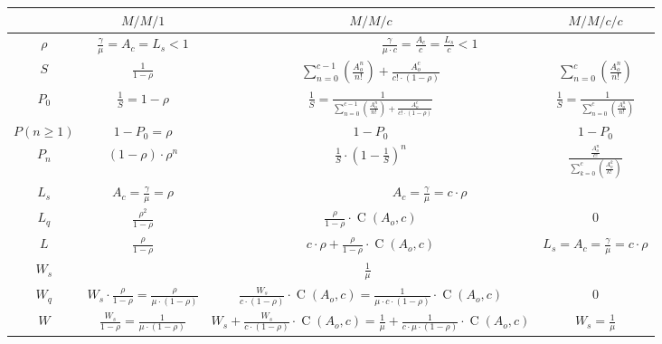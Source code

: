 \documentclass[
	12pt,
	twoside
]{book}
\begin{document}
\begin{landscape}

\begin{table}[H]
	\centering
	\begin{tabular}{|c|c|c|c|}
		\hline
		& $M/M/1$ & $M/M/c$ & $M/M/c/c$ \\
		\hline
		$\rho$ & $\frac {\gamma} {\mu} = A_c = L_s < 1$ & \multicolumn{2}{c|}{$\frac {\gamma} {\mu \cdot c} = \frac {A_c} {c} = \frac {L_s} {c} < 1$} \\
		\hline
		$S$ & $\frac {1} {1 - \rho}$ & $\sum_{n=0}^{c-1} \left( \frac {A_{o}^n} {n!} \right) + \frac {A_{o}^c} {c! \cdot (1-\rho)}$ & $\sum_{n=0}^{c} \left( \frac {A_{o}^n} {n!} \right)$ \\
		\hline
		$P_0$ & $\frac {1} {S} = 1 - \rho$ & $\frac {1} {S} = \frac {1} {\sum_{n=0}^{c-1} \left( \frac {A_{o}^n} {n!} \right) + \frac {A_{o}^c} {c! \cdot (1-\rho)}}$ & $\frac {1} {S} = \frac {1} {\sum_{n=0}^{c} \left( \frac {A_{o}^n} {n!} \right)}$ \\
		\hline
		$P(n \geq 1)$ & $1 - P_0 = \rho$ & $1 - P_0$ & $1 - P_0$ \\
		\hline
		$P_n$ & $(1 - \rho) \cdot \rho^n$ & $\frac {1} {S} \cdot \left( 1 - \frac {1} {S} \right)^n$ & $\frac {\frac{A_{o}^n}{c!}} {\sum_{k=0}^c \left( \frac {A_{o}^k} {k!} \right)}$ \\
		\hline
		$L_s$ & $A_c = \frac {\gamma} {\mu} = \rho$ & \multicolumn{2}{c|}{$A_c = \frac {\gamma} {\mu} = c \cdot \rho$} \\
		\hline
		$L_q$ & $\frac {\rho^2} {1-\rho}$ & $\frac {\rho} {1-\rho} \cdot \operatorname{C}(A_o, c)$ & $0$ \\
		\hline
		$L$ & $\frac {\rho} {1-\rho}$ & $c \cdot \rho + \frac {\rho} {1-\rho} \cdot \operatorname{C}(A_o, c)$ & $L_s = A_c = \frac {\gamma} {\mu} = c \cdot \rho$ \\
		\hline
		$W_s$ & \multicolumn{3}{c|}{$\frac {1} {\mu}$} \\
		\hline
		$W_q$ & $W_s \cdot \frac {\rho} {1-\rho} = \frac {\rho} {\mu \cdot (1-\rho)}$ & $\frac {W_s} {c \cdot (1-\rho)} \cdot \operatorname{C}(A_o, c) = \frac {1} {\mu \cdot c \cdot (1-\rho)} \cdot \operatorname{C}(A_o, c)$ & $0$ \\
		\hline
		$W$ & $\frac {W_s} {1-\rho} = \frac {1} {\mu \cdot (1-\rho)}$ & $W_s + \frac {W_s} {c \cdot (1-\rho)} \cdot \operatorname{C}(A_o, c) = \frac {1} {\mu} + \frac {1} {c \cdot \mu \cdot (1-\rho)} \cdot \operatorname{C}(A_o, c)$ & $W_s = \frac {1} {\mu}$ \\
		\hline

\end{tabular}
\end{table}
\end{landscape}
\end{document}
